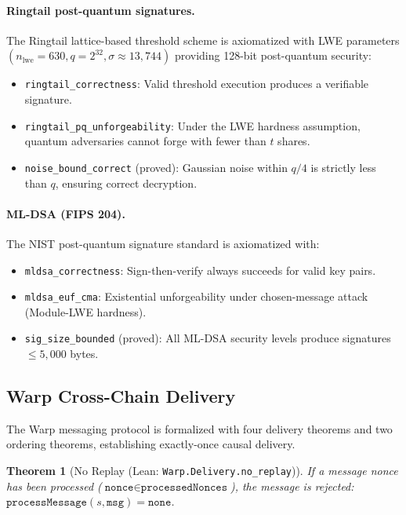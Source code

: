 \documentclass[11pt,a4paper]{article}
\newtheorem{theorem}{Theorem}[section]
\begin{document}
\paragraph{Ringtail post-quantum signatures.}
The Ringtail lattice-based threshold scheme is axiomatized with LWE parameters
$(n_{\text{lwe}} = 630, q = 2^{32}, \sigma \approx 13{,}744)$ providing 128-bit
post-quantum security:
\begin{itemize}[nosep]
\item \texttt{ringtail\_correctness}: Valid threshold execution produces a verifiable
signature.
\item \texttt{ringtail\_pq\_unforgeability}: Under the LWE hardness assumption, quantum
adversaries cannot forge with fewer than $t$ shares.
\item \texttt{noise\_bound\_correct} (proved): Gaussian noise within $q/4$ is strictly
less than $q$, ensuring correct decryption.
\end{itemize}

\paragraph{ML-DSA (FIPS 204).}
The NIST post-quantum signature standard is axiomatized with:
\begin{itemize}[nosep]
\item \texttt{mldsa\_correctness}: Sign-then-verify always succeeds for valid key pairs.
\item \texttt{mldsa\_euf\_cma}: Existential unforgeability under chosen-message attack
(Module-LWE hardness).
\item \texttt{sig\_size\_bounded} (proved): All ML-DSA security levels produce signatures
$\leq 5{,}000$ bytes.
\end{itemize}

\subsection{Warp Cross-Chain Delivery}

The Warp messaging protocol is formalized with four delivery theorems and two
ordering theorems, establishing exactly-once causal delivery.

\begin{theorem}[No Replay (Lean: \texttt{Warp.Delivery.no\_replay})]
\label{thm:formal-noreplay}
If a message nonce has been processed ($\texttt{nonce} \in \texttt{processedNonces}$),
the message is rejected: $\texttt{processMessage}(s, \texttt{msg}) = \texttt{none}$.
\end{theorem}
\end{document}
